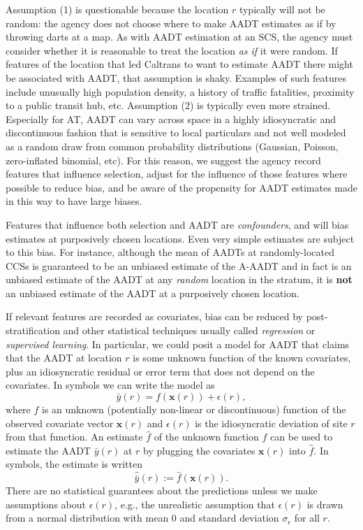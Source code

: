 \documentclass[11pt]{article}
\begin{document}
Assumption (1) is questionable because the location \(r\) typically will
not be random: the agency does not choose where to make AADT estimates
as if by throwing darts at a map. As with AADT estimation at an SCS, the
agency must consider whether it is reasonable to treat the location
\emph{as if} it were random. If features of the location that led
Caltrans to want to estimate AADT there might be associated with AADT,
that assumption is shaky. Examples of such features include unusually
high population density, a history of traffic fatalities, proximity to a
public transit hub, etc. Assumption (2) is typically even more strained.
Especially for AT, AADT can vary across space in a highly idiosyncratic
and discontinuous fashion that is sensitive to local particulars and not
well modeled as a random draw from common probability distributions
(Gaussian, Poisson, zero-inflated binomial, etc). For this reason, we
suggest the agency record features that influence selection, adjust for
the influence of those features where possible to reduce bias, and be
aware of the propensity for AADT estimates made in this way to have
large biases.

Features that influence both selection and AADT are \emph{confounders},
and will bias estimates at purposively chosen locations. Even very
simple estimates are subject to this bias. For instance, although the
mean of AADTs at randomly-located CCSs is guaranteed to be an unbiased
estimate of the A-AADT and in fact is an unbiased estimate of the AADT
at any \emph{random} location in the stratum, it is \textbf{not} an
unbiased estimate of the AADT at a purposively chosen location.

If relevant features are recorded as covariates, bias can be reduced by
post-stratification and other statistical techniques usually called
\emph{regression} or \emph{supervised learning}. In particular, we could
posit a model for AADT that claims that the AADT at location \(r\) is
some unknown function of the known covariates, plus an idiosyncratic
residual or error term that does not depend on the covariates. In
symbols we can write the model as
\[\bar{y}(r) = f(\mathbf{x}(r)) + \epsilon(r),\] where \(f\) is an
unknown (potentially non-linear or discontinuous) function of the
observed covariate vector \(\mathbf{x}(r)\) and \(\epsilon(r)\) is the
idiosyncratic deviation of site \(r\) from that function. An estimate
\(\hat{f}\) of the unknown function \(f\) can be used to estimate the
AADT \(\bar{y}(r)\) at \(r\) by plugging the covariates
\(\mathbf{x}(r)\) into \(\hat{f}\). In symbols, the estimate is written
\[\hat{\bar{y}}(r) := \hat{f}(\mathbf{x}(r)).\] There are no statistical
guarantees about the predictions unless we make assumptions about
\(\epsilon(r)\), e.g., the unrealistic assumption that \(\epsilon(r)\)
is drawn from a normal distribution with mean 0 and standard deviation
\(\sigma_\epsilon\) for all \(r\).
\end{document}

